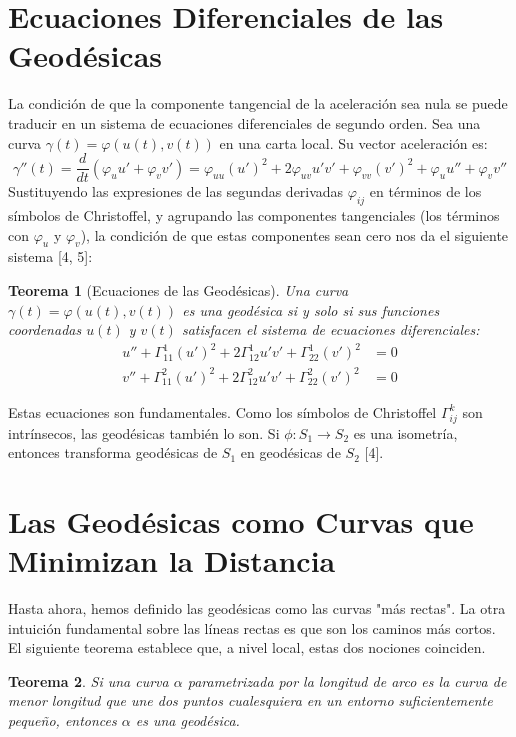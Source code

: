 \documentclass[12pt, a4paper]{report}
\theoremstyle{miestilo}
\newtheorem{teorema}{Teorema}[chapter]
\theoremstyle{midefinicion}
\begin{document}
\section{Ecuaciones Diferenciales de las Geodésicas}

La condición de que la componente tangencial de la aceleración sea nula se puede traducir en un sistema de ecuaciones diferenciales de segundo orden. Sea una curva $\gamma(t) = \varphi(u(t), v(t))$ en una carta local. Su vector aceleración es:
$$ \gamma''(t) = \frac{d}{dt}(\varphi_u u' + \varphi_v v') = \varphi_{uu}(u')^2 + 2\varphi_{uv}u'v' + \varphi_{vv}(v')^2 + \varphi_u u'' + \varphi_v v'' $$
Sustituyendo las expresiones de las segundas derivadas $\varphi_{ij}$ en términos de los símbolos de Christoffel, y agrupando las componentes tangenciales (los términos con $\varphi_u$ y $\varphi_v$), la condición de que estas componentes sean cero nos da el siguiente sistema [4, 5]:

\begin{teorema}[Ecuaciones de las Geodésicas]
Una curva $\gamma(t) = \varphi(u(t), v(t))$ es una geodésica si y solo si sus funciones coordenadas $u(t)$ y $v(t)$ satisfacen el sistema de ecuaciones diferenciales:
\begin{align*}
u'' + \Gamma_{11}^1 (u')^2 + 2\Gamma_{12}^1 u'v' + \Gamma_{22}^1 (v')^2 &= 0 \\
v'' + \Gamma_{11}^2 (u')^2 + 2\Gamma_{12}^2 u'v' + \Gamma_{22}^2 (v')^2 &= 0
\end{align*}
\end{teorema}

Estas ecuaciones son fundamentales. Como los símbolos de Christoffel $\Gamma_{ij}^k$ son intrínsecos, las geodésicas también lo son. Si $\phi: S_1 \to S_2$ es una isometría, entonces transforma geodésicas de $S_1$ en geodésicas de $S_2$ [4].

\section{Las Geodésicas como Curvas que Minimizan la Distancia}

Hasta ahora, hemos definido las geodésicas como las curvas "más rectas". La otra intuición fundamental sobre las líneas rectas es que son los caminos más cortos. El siguiente teorema establece que, a nivel local, estas dos nociones coinciden.

\begin{teorema}
Si una curva $\alpha$ parametrizada por la longitud de arco es la curva de menor longitud que une dos puntos cualesquiera en un entorno suficientemente pequeño, entonces $\alpha$ es una geodésica.
\end{teorema}
\end{document}
